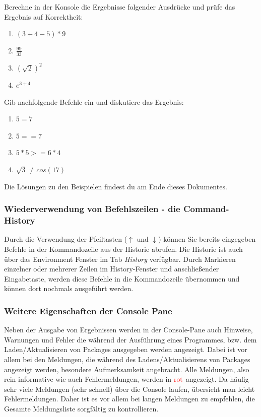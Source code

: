 \documentclass[]{article}
\providecommand{\tightlist}{%
  \setlength{\itemsep}{0pt}\setlength{\parskip}{0pt}}
\begin{document}
Berechne in der Konsole die Ergebnisse folgender Ausdrücke und prüfe das
Ergebnis auf Korrektheit:

\begin{enumerate}
\def\labelenumi{\alph{enumi}.}
\tightlist
\item
  \((3 + 4 - 5) * 9\)
\item
  \(\frac{99}{33}\)
\item
  \((\sqrt{2})^2\)
\item
  \(e^{3+4}\)
\end{enumerate}

Gib nachfolgende Befehle ein und diskutiere das Ergebnis:

\begin{enumerate}
\def\labelenumi{\alph{enumi}.}
\tightlist
\item
  \(5 = 7\)
\item
  \(5 == 7\)
\item
  \(5*5 >= 6*4\)
\item
  \(\sqrt{3} \neq cos(17)\)
\end{enumerate}

Die Lösungen zu den Beispielen findest du am Ende dieses Dokumentes.

\subsubsection*{Wiederverwendung von Befehlszeilen - die
Command-History}\label{wiederverwendung-von-befehlszeilen---die-command-history}

Durch die Verwendung der Pfeiltasten (\(\uparrow\) und \(\downarrow\))
können Sie bereits eingegeben Befehle in der Kommandozeile aus der
Historie abrufen. Die Historie ist auch über das Environment Fenster im
Tab \emph{History} verfügbar. Durch Markieren einzelner oder mehrerer
Zeilen im History-Fenster und anschließender Eingabetaste, werden diese
Befehle in die Kommandozeile übernommen und können dort nochmals
ausgeführt werden.

\subsubsection*{Weitere Eigenschaften der Console
Pane}\label{weitere-eigenschaften-der-console-pane}

Neben der Ausgabe von Ergebnissen werden in der Console-Pane auch
Hinweise, Warnungen und Fehler die während der Ausführung eines
Programmes, bzw. dem Laden/Aktualisieren von Packages ausgegeben werden
angezeigt. Dabei ist vor allem bei den Meldungen, die während des
Ladens/Aktualisierens von Packages angezeigt werden, besondere
Aufmerksamkeit angebracht. Alle Meldungen, also rein informative wie
auch Fehlermeldungen, werden in \(\color{red}{\text{rot}}\) angezeigt.
Da häufig sehr viele Meldungen (sehr schnell) über die Console laufen,
übersieht man leicht Fehlermeldungen. Daher ist es vor allem bei langen
Meldungen zu empfehlen, die Gesamte Meldungsliste sorgfältig zu
kontrollieren.
\end{document}
